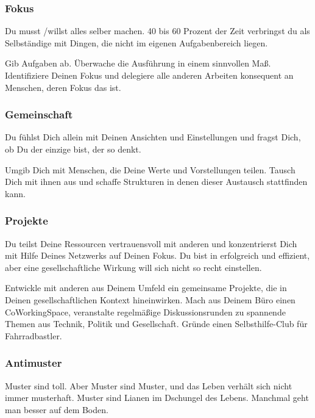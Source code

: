 {    \subsubsection{Fokus}
\begin{em} Du musst /willst alles selber machen.
%
40 bis 60 Prozent der Zeit verbringst du als Selbständige mit Dingen, die nicht im eigenen Aufgabenbereich liegen.
\end{em}


Gib Aufgaben ab.
%
Überwache die Ausführung in einem sinnvollen Maß.
%
Identifiziere Deinen Fokus und delegiere alle anderen Arbeiten konsequent an Menschen, deren Fokus das ist.
     \subsubsection{Gemeinschaft}
\begin{em} Du fühlst Dich allein mit Deinen Ansichten und Einstellungen und fragst Dich, ob Du der einzige bist, 
der so denkt. \end{em}


Umgib Dich mit Menschen, die Deine Werte und Vorstellungen teilen.
%
Tausch Dich mit ihnen aus und schaffe Strukturen in denen dieser Austausch stattfinden kann.

\subsubsection{Projekte}
\begin{em}
Du teilst Deine Ressourcen vertrauensvoll mit anderen und konzentrierst Dich mit Hilfe Deines 
Netzwerks auf Deinen Fokus. Du bist in erfolgreich und effizient, aber eine gesellschaftliche Wirkung 
will sich nicht so recht einstellen.
\end{em}



Entwickle mit anderen aus Deinem Umfeld ein gemeinsame Projekte, die in Deinen gesellschaftlichen 
Kontext  hineinwirken.  Mach  aus  Deinem  Büro  einen  CoWorkingSpace,  veranstalte  regelmäßige 
Diskussionsrunden  zu  spannende  Themen  aus  Technik,  Politik  und  Gesellschaft.  Gründe  einen 
Selbsthilfe-Club für Fahrradbastler.

    
    \subsubsection{Antimuster}
Muster sind toll.
%
Aber Muster sind Muster, und das Leben verhält sich nicht immer musterhaft.
%
Muster sind Lianen im Dschungel des Lebens. Manchmal geht man besser auf dem Boden.
}
